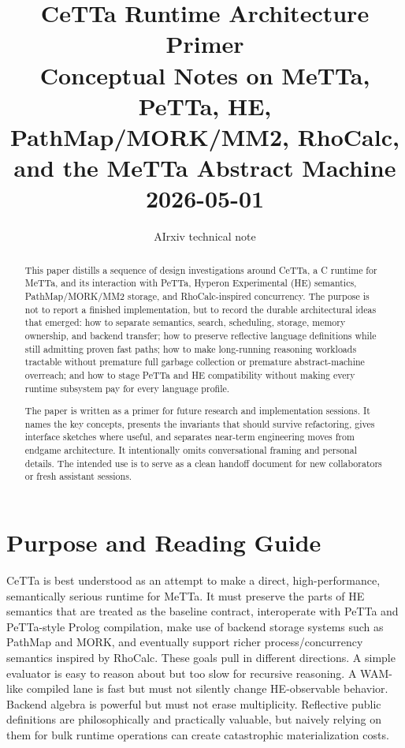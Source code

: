 \documentclass[11pt]{article}
\title{\textbf{CeTTa Runtime Architecture Primer}\\
Conceptual Notes on MeTTa, PeTTa, HE, PathMap/MORK/MM2, RhoCalc, and the MeTTa Abstract Machine\\
\large 2026-05-01}
\author{AIrxiv technical note}
\date{}
\newcommand{\CeTTa}{CeTTa}
\newcommand{\MeTTa}{MeTTa}
\newcommand{\PeTTa}{PeTTa}
\newcommand{\HE}{HE}
\newcommand{\PathMap}{PathMap}
\newcommand{\MORK}{MORK}
\newcommand{\MM}{MM2}
\newcommand{\RhoCalc}{RhoCalc}
\begin{document}
\maketitle

\begin{abstract}
This paper distills a sequence of design investigations around \CeTTa{}, a C runtime for \MeTTa{}, and its interaction with \PeTTa{}, Hyperon Experimental (\HE{}) semantics, \PathMap{}/\MORK{}/\MM{} storage, and \RhoCalc{}-inspired concurrency.  The purpose is not to report a finished implementation, but to record the durable architectural ideas that emerged: how to separate semantics, search, scheduling, storage, memory ownership, and backend transfer; how to preserve reflective language definitions while still admitting proven fast paths; how to make long-running reasoning workloads tractable without premature full garbage collection or premature abstract-machine overreach; and how to stage \PeTTa{} and \HE{} compatibility without making every runtime subsystem pay for every language profile.

The paper is written as a primer for future research and implementation sessions.  It names the key concepts, presents the invariants that should survive refactoring, gives interface sketches where useful, and separates near-term engineering moves from endgame architecture.  It intentionally omits conversational framing and personal details.  The intended use is to serve as a clean handoff document for new collaborators or fresh assistant sessions.
\end{abstract}

\tableofcontents
\newpage

\section{Purpose and Reading Guide}

\CeTTa{} is best understood as an attempt to make a direct, high-performance, semantically serious runtime for \MeTTa{}.  It must preserve the parts of \HE{} semantics that are treated as the baseline contract, interoperate with \PeTTa{} and \PeTTa{}-style Prolog compilation, make use of backend storage systems such as \PathMap{} and \MORK{}, and eventually support richer process/concurrency semantics inspired by \RhoCalc{}.  These goals pull in different directions.  A simple evaluator is easy to reason about but too slow for recursive reasoning.  A WAM-like compiled lane is fast but must not silently change \HE{}-observable behavior.  Backend algebra is powerful but must not erase multiplicity.  Reflective public definitions are philosophically and practically valuable, but naively relying on them for bulk runtime operations can create catastrophic materialization costs.
\end{document}
